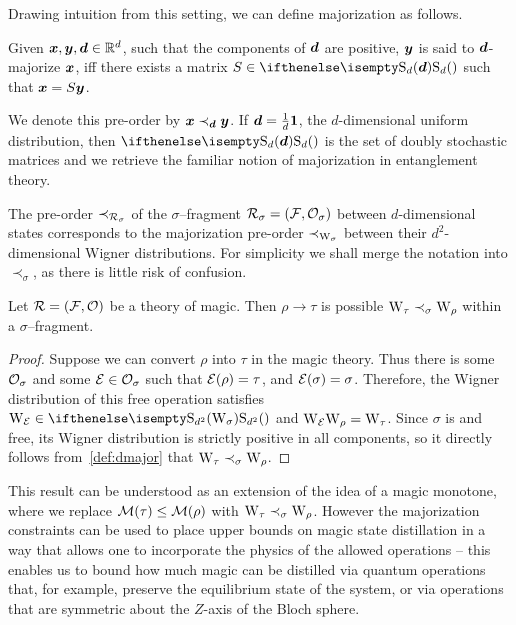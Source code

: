\documentclass[pra,
aps,
twocolumn,
superscriptaddress,
groupedaddress,
nofootinbib,
reprint
]{revtex4-1}
\begin{document}
Drawing intuition from this setting, we can define majorization as follows.
\begin{definition}\label{def:dmajor}
    Given $\bm{x}, \bm{y}, \bm{d} \in \mathbb{R}^d$, such that the components of $\bm{d}$ are positive, $\bm{y}$ is said to $\bm{d}$-majorize $\bm{x}$, iff there exists a matrix $S \in \stoch$ such that $\bm{x} = S\bm{y}$.
\end{definition}
We denote this pre-order by $\bm{x} \prec_{\bm{d}} \bm{y}$.
If $\bm{d} = \frac{1}{d}\bm{1}$, the $d$-dimensional uniform distribution, then $\stoch$ is the set of doubly stochastic matrices and we retrieve the familiar notion of majorization in entanglement theory. 

The pre-order $\prec_{\mathcal{R}_\sigma}$ of the $\sigma$--fragment $\mathcal{R}_\sigma = (\mathcal{F}, \mathcal{O}_\sigma)$ between $d$-dimensional states corresponds to the majorization pre-order $\prec_{\W{\sigma}}$ between their $d^2$-dimensional Wigner distributions.
For simplicity we shall merge the notation into $\prec_\sigma$, as there is little risk of confusion.


\begin{theorem}\label{thm:sigmamajor}
    Let $\mathcal{R} = (\mathcal{F}, \mathcal{O})$ be a theory of magic. Then $\rho \longrightarrow \tau$ is possible   $\W{\tau} \prec_\sigma \W{\rho}$ within a $\sigma$--fragment.
\end{theorem}
\begin{proof}
Suppose we can convert $\rho$ into $\tau$ in the magic theory. 
Thus there is some $\mathcal{O}_\sigma$ and some $\mathcal{E} \in \mathcal{O}_\sigma$ such that $\mathcal{E}(\rho) = \tau$, and $\mathcal{E}(\sigma)=\sigma$. 
Therefore, the Wigner distribution of this free operation satisfies $\W{\E} \in \stochw$ and $\W{\E}\W{\rho} = \W{\tau}$. 
Since $\sigma$ is  and free, its Wigner distribution is strictly positive in all components, so it directly follows from~\cref{def:dmajor} that $\W{\tau} \prec_{\sigma} \W{\rho}$.
\end{proof}
This result can be understood as an extension of the idea of a magic monotone, where we replace $\mathcal{M}(\tau) \leq \mathcal{M}(\rho)$ with $\W{\tau} \prec_\sigma \W{\rho}$. 
However the majorization constraints can be used to place upper bounds on magic state distillation in a way that allows one to incorporate the physics of the allowed operations -- this enables us to bound how much magic can be distilled via quantum operations that, for example, preserve the equilibrium state of the system, or via operations that are symmetric about the $Z$-axis of the Bloch sphere.
\end{document}

